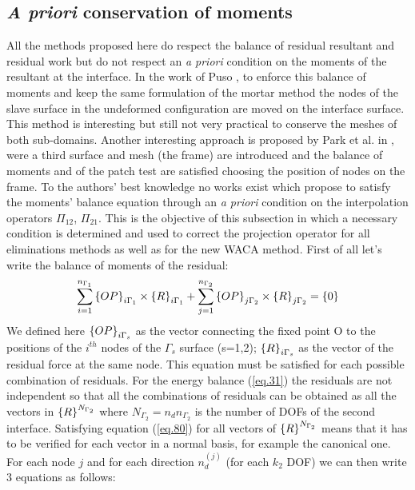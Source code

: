 \subsection{\textit{A priori} conservation of moments}\label{ssec37}
All the methods proposed here do respect the balance of residual resultant and residual work but do not respect an \textit{a priori} condition on the moments of the resultant at the interface. In the work of Puso \cite{puso20043d}, to enforce this balance of moments and keep the same formulation of the mortar method the nodes of the slave surface in the undeformed configuration are moved on the interface surface. This method is interesting but still not very practical to conserve the meshes of both sub-domains. Another interesting approach is proposed by  Park et al. in \cite{park2002simpl}, were a third surface and mesh (the frame) are introduced and the balance of moments and of the patch test are satisfied choosing the position of nodes on the frame. To the authors' best knowledge no works exist which propose to satisfy the moments' balance equation through an \textit{a priori} condition on the interpolation operators $\Pi_{12}$, $\Pi_{21}$. This is the objective of this subsection in which a necessary condition is determined and used to correct the projection operator for all eliminations methods as well as for the new WACA method.
First of all let’s write the balance of moments of the residual:
\begin{equation}
\label{eq.80}
\sum_{i=1}^{n_{\Gamma_1}}\left\lbrace{OP}\right \rbrace_{i\Gamma_1}\times \left\lbrace{R}\right \rbrace_{i\Gamma_1}+\sum_{j=1}^{n_{\Gamma_2}}\left\lbrace{OP}\right \rbrace_{j\Gamma_2}\times \left\lbrace{R}\right \rbrace_{j\Gamma_2}=\left\lbrace{0}\right \rbrace
\end{equation}
We defined here $\left\lbrace{OP}\right \rbrace_{i\Gamma_s}$ as the vector connecting the fixed point O to the positions of the $i^{th}$ nodes of the $\Gamma_s$ surface (s=1,2); $\left\lbrace{R}\right \rbrace_{i\Gamma_s}$ as the vector of the residual force at the same node. This equation must be satisfied for each possible combination of residuals. For the energy balance (\ref{eq.31}) the residuals are not independent so that all the combinations of residuals can be obtained as all the vectors in $\left\lbrace{R}\right \rbrace^{N_{\Gamma_2}}$ where $N_{\Gamma_2}=n_d n_{\Gamma_2}$ is the number of DOFs of the second interface. Satisfying equation (\ref{eq.80}) for all vectors of $\left\lbrace{R}\right \rbrace^{N_{\Gamma_2}}$ means that it has to be verified for each vector in a normal basis, for example the canonical one.
For each node $j$ and for each direction $n_d^{(j)}$ (for each $k_2$ DOF) we can then write 3 equations as follows: 
